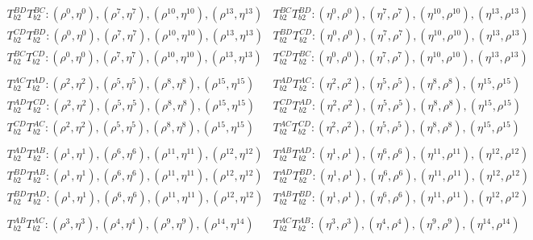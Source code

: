\documentclass{article}
\begin{document}
\begin{equation}
\begin{array}{ll}
    T^{BD}_{b2}T^{BC}_{b2}:(\rho^0, \eta^0), (\rho^7, \eta^7), (\rho^{10}, \eta^{10}), (\rho^{13}, \eta^{13}) & 
    T^{BC}_{b2}T^{BD}_{b2}:(\eta^0, \rho^0), (\eta^7, \rho^7), (\eta^{10}, \rho^{10}), (\eta^{13}, \rho^{13})\\ 

    T^{CD}_{b2}T^{BD}_{b2}:(\rho^0, \eta^0), (\rho^7, \eta^7), (\rho^{10}, \eta^{10}), (\rho^{13}, \eta^{13}) &
    T^{BD}_{b2}T^{CD}_{b2}:(\eta^0, \rho^0), (\eta^7, \rho^7), (\eta^{10}, \rho^{10}), (\eta^{13}, \rho^{13})\\

    T^{BC}_{b2}T^{CD}_{b2}:(\rho^0, \eta^0), (\rho^7, \eta^7), (\rho^{10}, \eta^{10}), (\rho^{13}, \eta^{13})&
    T^{CD}_{b2}T^{BC}_{b2}:(\eta^0, \rho^0), (\eta^7, \rho^7), (\eta^{10}, \rho^{10}), (\eta^{13}, \rho^{13})\\
    \\
    T^{AC}_{b2}T^{AD}_{b2}:(\rho^2, \eta^2), (\rho^5, \eta^5), (\rho^8, \eta^8), (\rho^{15}, \eta^{15}) &
    T^{AD}_{b2}T^{AC}_{b2}:(\eta^2, \rho^2), (\eta^5, \rho^5), (\eta^8, \rho^8), (\eta^{15}, \rho^{15})\\
    
    T^{AD}_{b2}T^{CD}_{b2}:(\rho^2, \eta^2), (\rho^5, \eta^5), (\rho^8, \eta^8), (\rho^{15}, \eta^{15}) &
    T^{CD}_{b2}T^{AD}_{b2}:(\eta^2, \rho^2), (\eta^5, \rho^5), (\eta^8, \rho^8), (\eta^{15}, \rho^{15})\\
    
    T^{CD}_{b2}T^{AC}_{b2}:(\rho^2, \eta^2), (\rho^5, \eta^5), (\rho^8, \eta^8), (\rho^{15}, \eta^{15}) &
    T^{AC}_{b2}T^{CD}_{b2}:(\eta^2, \rho^2), (\eta^5, \rho^5), (\eta^8, \rho^8), (\eta^{15}, \rho^{15})\\
    \\
    T^{AD}_{b2}T^{AB}_{b2}:(\rho^1, \eta^1), (\rho^6, \eta^6), (\rho^{11}, \eta^{11}), (\rho^{12}, \eta^{12}) &
    T^{AB}_{b2}T^{AD}_{b2}:(\eta^1, \rho^1), (\eta^6, \rho^6), (\eta^{11}, \rho^{11}), (\eta^{12}, \rho^{12})\\

    T^{BD}_{b2}T^{AB}_{b2}:(\rho^1, \eta^1), (\rho^6, \eta^6), (\rho^{11}, \eta^{11}), (\rho^{12}, \eta^{12}) &
    T^{AD}_{b2}T^{BD}_{b2}:(\eta^1, \rho^1), (\eta^6, \rho^6), (\eta^{11}, \rho^{11}), (\eta^{12}, \rho^{12})\\
    
    T^{BD}_{b2}T^{AD}_{b2}:(\rho^1, \eta^1), (\rho^6, \eta^6), (\rho^{11}, \eta^{11}), (\rho^{12}, \eta^{12}) &
    T^{AB}_{b2}T^{BD}_{b2}:(\eta^1, \rho^1), (\eta^6, \rho^6), (\eta^{11}, \rho^{11}), (\eta^{12}, \rho^{12})\\
    \\
    T^{AB}_{b2}T^{AC}_{b2}:(\rho^3, \eta^3), (\rho^4, \eta^4), (\rho^9, \eta^9), (\rho^{14}, \eta^{14}) &
    T^{AC}_{b2}T^{AB}_{b2}:(\eta^3, \rho^3), (\eta^4, \rho^4), (\eta^9, \rho^9), (\eta^{14}, \rho^{14})\\
    

\end{array}
\end{equation}
\end{document}
